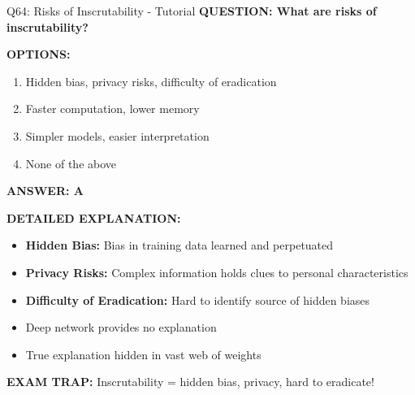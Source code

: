 \documentclass[8pt]{beamer}
\begin{document}
	\begin{frame}{Q64: Risks of Inscrutability - Tutorial}
		\fontsize{6.5}{7.5}\selectfont
		\textbf{QUESTION: What are risks of inscrutability?}
		
		\vspace{0.1cm}
		\textbf{OPTIONS:}
		\begin{enumerate}
			\item Hidden bias, privacy risks, difficulty of eradication
			\item Faster computation, lower memory
			\item Simpler models, easier interpretation
			\item None of the above
		\end{enumerate}
		
		\vspace{0.1cm}
		\textcolor{myblue}{\textbf{ANSWER: A}}
		
		\vspace{0.1cm}
		\textbf{DETAILED EXPLANATION:}
		\begin{itemize}
			\item \textbf{Hidden Bias:} Bias in training data learned and perpetuated
			\item \textbf{Privacy Risks:} Complex information holds clues to personal characteristics
			\item \textbf{Difficulty of Eradication:} Hard to identify source of hidden biases
			\item Deep network provides no explanation
			\item True explanation hidden in vast web of weights
		\end{itemize}
		
		\vspace{0.1cm}
		\textcolor{myred}{\textbf{EXAM TRAP:}} Inscrutability = \textcolor{myblue}{hidden bias, privacy, hard to eradicate}!
	\end{frame}
	
\end{document}
